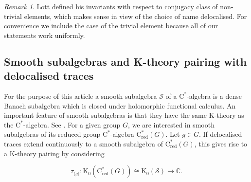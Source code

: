 \documentclass[a4paper,leqno,12pt]{article}
\numberwithin{equation}{section}
\theoremstyle{plain}
\theoremstyle{definition}
\newtheorem{definition}[theoremcounter]{Definition}
\theoremstyle{remark}
\newtheorem{remark}[theoremcounter]{Remark}
\newcommand{\Cs}{\mathrm{C}^*}
\newcommand{\Csr}{\mathrm{C}^*_{\text{red}}}
\newcommand{\ra}{\rightarrow}
\begin{document}
	\begin{remark}
		Lott defined his invariants with respect to conjugacy class of non-trivial elements, which makes sense in view of the choice of name delocalised. 
		For convenience we include the case of the trivial element because all of our statements work uniformly. 
		
	\end{remark}
	
	
	\subsection{Smooth subalgebras and K-theory pairing with delocalised traces} \label{subsec:smooth sal}
	
	For the purpose of this article a smooth subalgebra $\mathcal S$ of a $\Cs$-algebra is a dense Banach subalgebra which is closed under holomorphic functional calculus. 
	An important feature of smooth subalgebras is that they have the same K-theory as the $\Cs$-algebra. See \cite[Appendix A]{bost}.
	For a given group $G$, we are interested in smooth subalgebras of its reduced group $\Cs$-algebra $\Csr(G)$. Let $g\in G$. 
	If delocalised traces extend continuously to a smooth subalgebra of $\Csr(G)$, this gives rise to a K-theory pairing by considering
	
	\[
	\tau_{\langle g \rangle}: \mathrm{K}_0(\Csr(G))\cong \mathrm{K}_0(\mathcal S)\ra \mathbb C.
	\]
	
\end{document}
